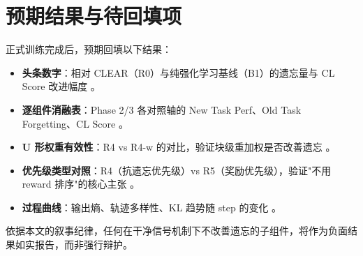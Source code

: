 \section{预期结果与待回填项}
\label{sec:exp-expected}

正式训练完成后，预期回填以下结果：

\begin{itemize}
  \item \textbf{头条数字}：相对 CLEAR（R0）与纯强化学习基线（B1）的遗忘量与 CL Score 改进幅度 。
  \item \textbf{逐组件消融表}：Phase 2/3 各对照轴的 New Task Perf、Old Task Forgetting、CL Score 。
  \item \textbf{U 形权重有效性}：R4 vs R4-w 的对比，验证块级重加权是否改善遗忘 。
  \item \textbf{优先级类型对照}：R4（抗遗忘优先级）vs R5（奖励优先级），验证"不用 reward 排序"的核心主张 。
  \item \textbf{过程曲线}：输出熵、轨迹多样性、KL 趋势随 step 的变化 。
\end{itemize}

依据本文的叙事纪律，任何在干净信号机制下不改善遗忘的子组件，将作为负面结果如实报告，而非强行辩护。
